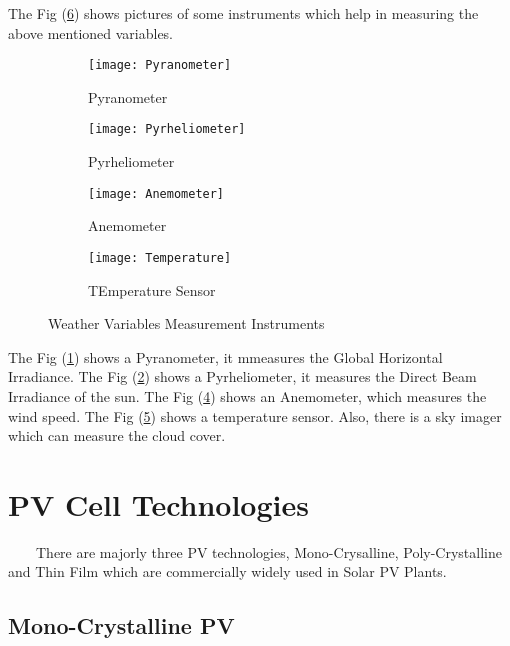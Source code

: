 The Fig (\ref{mfigc3h1}) shows pictures of some instruments which help in measuring the above mentioned variables.

\begin{figure}[H]
    \centering
    \begin{subfigure}[b]{0.45\textwidth}
       \centering
\texttt{[image: Pyranometer]}
\caption{Pyranometer}
\label{figc3h8}
    \end{subfigure}
    \hfill%
        \begin{subfigure}[b]{0.45\textwidth}
       \centering
\texttt{[image: Pyrheliometer]}
\caption{Pyrheliometer}
\label{figc3h9} %
    \end{subfigure}
    \caption{}
    \label{}
\end{figure} 
   

\begin{figure}[H]
    \centering
    \begin{subfigure}[b]{0.45\textwidth}
\centering
\texttt{[image: Anemometer]}
\caption{Anemometer}
\label{figc3h10} %
    \end{subfigure}
    \hfill%
        \begin{subfigure}[b]{0.45\textwidth}
\centering
\texttt{[image: Temperature]}
\caption{TEmperature Sensor}
\label{figc3h11} %
    \end{subfigure}
    \caption{Weather Variables Measurement Instruments}
    \label{mfigc3h1}
\end{figure}  

The Fig (\ref{figc3h8}) shows a Pyranometer, it mmeasures the Global Horizontal Irradiance. The Fig (\ref{figc3h9}) shows a Pyrheliometer, it measures the Direct Beam Irradiance of the sun. The Fig (\ref{figc3h10}) shows an Anemometer, which measures the wind speed. The Fig (\ref{figc3h11}) shows a temperature sensor. Also, there is a sky imager which can measure the cloud cover.

\section{PV Cell Technologies}
\
\
\
\
There are majorly three PV technologies, Mono-Crysalline, Poly-Crystalline and Thin Film which are commercially widely used in Solar PV Plants.

\subsection{Mono-Crystalline PV}

